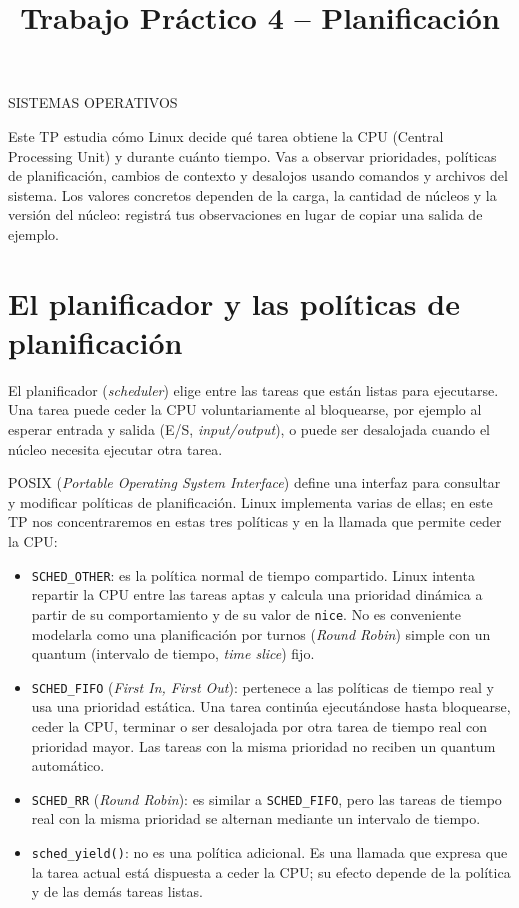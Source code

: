 \documentclass[11pt,a4paper]{article}
\title{Trabajo Práctico 4 -- Planificación}
\author{}
\date{}
\begin{document}
\maketitle
\thispagestyle{fancy}
\begin{center}
SISTEMAS OPERATIVOS
\end{center}
\newpage

\tableofcontents
\newpage

Este TP estudia cómo Linux decide qué tarea obtiene la CPU (Central
Processing Unit) y durante cuánto tiempo. Vas a observar prioridades,
políticas de planificación, cambios de contexto y desalojos usando comandos y
archivos del sistema. Los valores concretos dependen de la carga, la cantidad
de núcleos y la versión del núcleo: registrá tus observaciones en lugar de
copiar una salida de ejemplo.

\section{El planificador y las políticas de planificación}

El planificador (\emph{scheduler}) elige entre las tareas que están listas
para ejecutarse. Una tarea puede ceder la CPU voluntariamente al bloquearse,
por ejemplo al esperar entrada y salida (E/S, \emph{input/output}), o puede
ser desalojada cuando el núcleo necesita ejecutar otra tarea.

POSIX (\emph{Portable Operating System Interface}) define una interfaz para
consultar y modificar políticas de planificación. Linux implementa varias de
ellas; en este TP nos concentraremos en estas tres políticas y en la llamada
que permite ceder la CPU:

\begin{itemize}
  \item \texttt{SCHED\_OTHER}: es la política normal de tiempo compartido.
  Linux intenta repartir la CPU entre las tareas aptas y calcula una prioridad
  dinámica a partir de su comportamiento y de su valor de \texttt{nice}. No
  es conveniente modelarla como una planificación por turnos (\emph{Round
  Robin}) simple con un quantum (intervalo de tiempo, \emph{time slice}) fijo.
  \item \texttt{SCHED\_FIFO} (\emph{First In, First Out}): pertenece a las
  políticas de tiempo real y usa una prioridad estática. Una tarea continúa
  ejecutándose hasta bloquearse, ceder la CPU, terminar o ser desalojada por
  otra tarea de tiempo real con prioridad mayor. Las tareas con la misma
  prioridad no reciben un quantum automático.
  \item \texttt{SCHED\_RR} (\emph{Round Robin}): es similar a
  \texttt{SCHED\_FIFO}, pero las tareas de tiempo real con la misma prioridad
  se alternan mediante un intervalo de tiempo.
  \item \texttt{sched\_yield()}: no es una política adicional. Es una llamada
  que expresa que la tarea actual está dispuesta a ceder la CPU; su efecto
  depende de la política y de las demás tareas listas.
\end{itemize}
\end{document}
